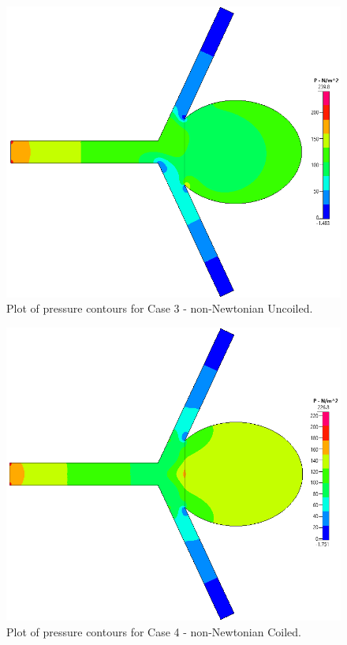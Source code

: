 \documentclass[journal,twoside,web]{ieeecolor}
\begin{document}
\begin{figure}[!t]
    \centerline{\includegraphics[width=\columnwidth]{img/geom17Pressure.png}}
    \caption{Plot of pressure contours for Case 3 - non-Newtonian Uncoiled.}
    \label{geom17P}
\end{figure}
\begin{figure}[!t]
    \centerline{\includegraphics[width=\columnwidth]{img/geom18Pressure.png}}
    \caption{Plot of pressure contours for Case 4 - non-Newtonian Coiled.}
    \label{geom18P}
\end{figure}
\end{document}
